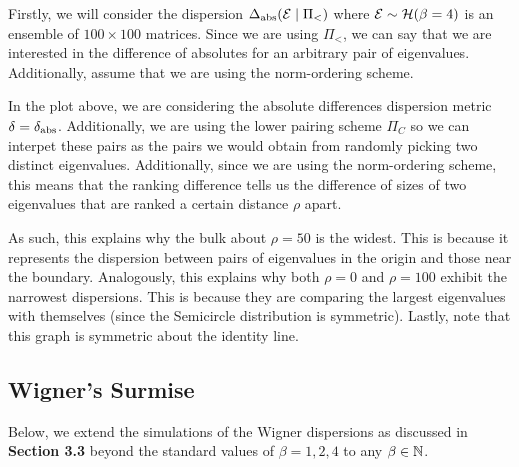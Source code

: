 Firstly, we will consider the dispersion $\Delta_{\text{abs}}(\mathcal{E} \mid \Pi_<)$ where $\mathcal{E} \sim \mathcal{H}(\beta = 4)$ is an ensemble of $100 \times 100$ matrices. Since we are using $\Pi_<$, we can say that we are interested in the difference of absolutes for an arbitrary pair of eigenvalues. Additionally, assume that we are using the norm-ordering scheme.



In the plot above, we are considering the absolute differences dispersion metric $\delta = \delta_{\text{abs}}$. Additionally, we are using the lower pairing scheme $\Pi_C$ so we can interpet these pairs as the pairs we would obtain from randomly picking two distinct eigenvalues.
Additionally, since we are using the norm-ordering scheme, this means that the ranking difference tells us the difference of sizes of two eigenvalues that are ranked a certain distance $\rho$ apart.

As such, this explains why the bulk about $\rho = 50$ is the widest. This is because it represents the dispersion between pairs of eigenvalues in the origin and those near the boundary. Analogously, this explains why both $\rho = 0$ and $\rho = 100$ exhibit the narrowest dispersions. This is because they are comparing the largest eigenvalues with themselves (since the Semicircle distribution is symmetric). Lastly, note that this graph is symmetric about the identity line.

\newpage
\subsection{Wigner's Surmise}


Below, we extend the simulations of the Wigner dispersions as discussed in \textbf{Section 3.3} beyond the standard values of $\beta = 1,2,4$ to any $\beta \in \mathbb{N}$.


